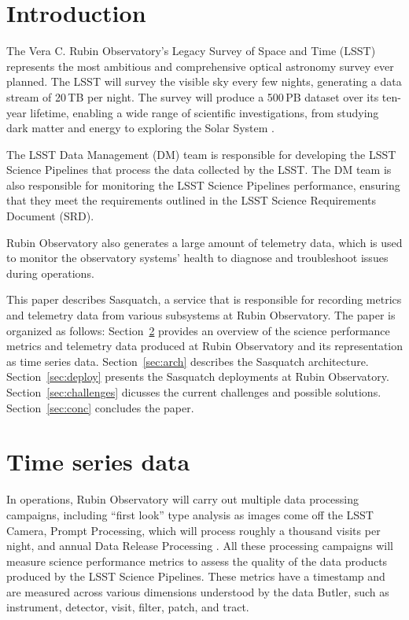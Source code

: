 \section{Introduction}

The Vera C. Rubin Observatory's Legacy Survey of Space and Time (LSST) represents the most ambitious and comprehensive optical astronomy survey ever planned. The LSST will survey the visible sky every few nights, generating a data stream of 20\,TB per night. The survey will produce a 500\,PB dataset over its ten-year lifetime, enabling a wide range of scientific investigations, from studying dark matter and energy to exploring the Solar System \cite{2019ApJ...873..111I}.

The LSST Data Management (DM) team is responsible for developing the LSST Science Pipelines that process the data collected by the LSST. The DM team is also responsible for monitoring the LSST Science Pipelines performance, ensuring that they meet the requirements outlined in the LSST Science Requirements Document (SRD). \cite{LPM-17}

Rubin Observatory also generates a large amount of telemetry data, which is used to monitor the observatory systems' health to diagnose and troubleshoot issues during operations.

This paper describes Sasquatch, a service that is responsible for recording metrics and telemetry data from various subsystems at Rubin Observatory. The paper is organized as follows: Section~\ref{sec:tsd} provides an overview of the science performance metrics and telemetry data produced at Rubin Observatory and its representation as time series data. Section~\ref{sec:arch} describes the Sasquatch architecture. Section~\ref{sec:deploy} presents the Sasquatch deployments at Rubin Observatory. Section~\ref{sec:challenges} dicusses the current challenges and possible solutions. Section~\ref{sec:conc} concludes the paper.

\section{Time series data}
\label{sec:tsd}

In operations, Rubin Observatory will carry out multiple data processing campaigns, including ``first look'' type analysis as images come off the LSST Camera, Prompt Processing, which will process roughly a thousand visits per night, and annual Data Release Processing \cite{LSE-163}. All these processing campaigns will measure science performance metrics to assess the quality of the data products produced by the LSST Science Pipelines. \cite{2019ASPC..523..521B,2022SPIE12189E..0MG} These metrics have a timestamp and are measured across various dimensions understood by the data Butler,\cite{2022SPIE12189E..11J} such as instrument, detector, visit, filter, patch, and tract.

